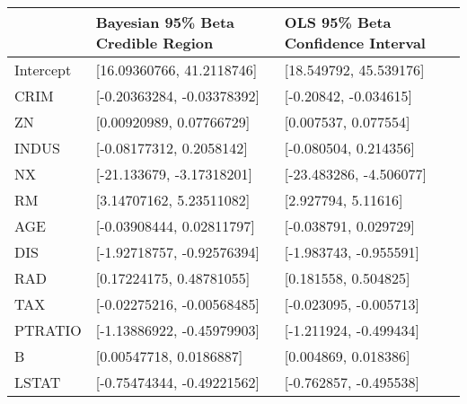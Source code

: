 \begin{tabular}{lll}
\hline
           & Bayesian 95\% Beta Credible Region   & OLS 95\% Beta Confidence Interval   \\
\hline
 Intercept & [16.09360766, 41.2118746]           & [18.549792, 45.539176]             \\
 CRIM      & [-0.20363284, -0.03378392]          & [-0.20842, -0.034615]              \\
 ZN        & [0.00920989, 0.07766729]            & [0.007537, 0.077554]               \\
 INDUS     & [-0.08177312, 0.2058142]            & [-0.080504, 0.214356]              \\
 NX        & [-21.133679, -3.17318201]           & [-23.483286, -4.506077]            \\
 RM        & [3.14707162, 5.23511082]            & [2.927794, 5.11616]                \\
 AGE       & [-0.03908444, 0.02811797]           & [-0.038791, 0.029729]              \\
 DIS       & [-1.92718757, -0.92576394]          & [-1.983743, -0.955591]             \\
 RAD       & [0.17224175, 0.48781055]            & [0.181558, 0.504825]               \\
 TAX       & [-0.02275216, -0.00568485]          & [-0.023095, -0.005713]             \\
 PTRATIO   & [-1.13886922, -0.45979903]          & [-1.211924, -0.499434]             \\
 B         & [0.00547718, 0.0186887]             & [0.004869, 0.018386]               \\
 LSTAT     & [-0.75474344, -0.49221562]          & [-0.762857, -0.495538]             \\
\hline
\end{tabular}